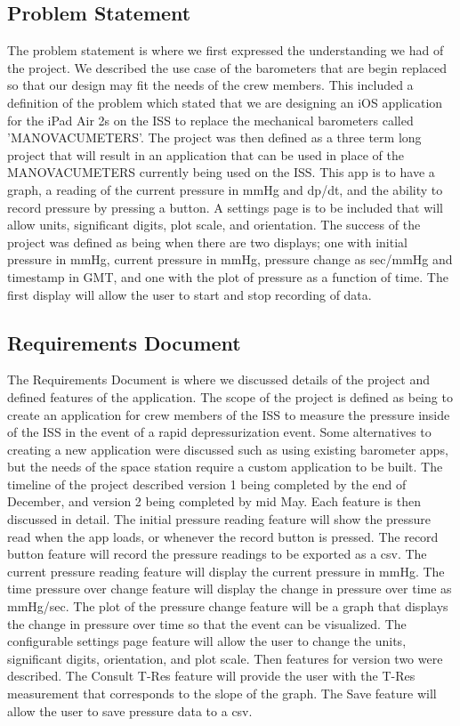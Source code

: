 \documentclass[onecolumn, draftclsnofoot,10pt, compsoc]{IEEEtran}
\begin{document}
\subsection{Problem Statement}
The problem statement is where we first expressed the understanding we had of the project.
We described the use case of the barometers that are begin replaced so that our design may fit the needs of the crew members.
This included a definition of the problem which stated that we are designing an iOS application for the iPad Air 2s on the ISS to replace the mechanical barometers called 'MANOVACUMETERS'.
The project was then defined as a three term long project that will result in an application that can be used in place of the MANOVACUMETERS currently being used on the ISS.
This app is to have a graph, a reading of the current pressure in mmHg and dp/dt, and the ability to record pressure by pressing a button.
A settings page is to be included that will allow units, significant digits, plot scale, and orientation.
The success of the project was defined as being when there are two displays; one with initial pressure in mmHg, current pressure in mmHg, pressure change as sec/mmHg and timestamp in GMT, and one with the plot of pressure as a function of time.
The first display will allow the user to start and stop recording of data.

\subsection{Requirements Document}
The Requirements Document is where we discussed details of the project and defined features of the application.
The scope of the project is defined as being to create an application for crew members of the ISS to measure the pressure inside of the ISS in the event of a rapid depressurization event.
Some alternatives to creating a new application were discussed such as using existing barometer apps, but the needs of the space station require a custom application to be built.
The timeline of the project described version 1 being completed by the end of December, and version 2 being completed by mid May.
Each feature is then discussed in detail.
The initial pressure reading feature will show the pressure read when the app loads, or whenever the record button is pressed.
The record button feature will record the pressure readings to be exported as a csv.
The current pressure reading feature will display the current pressure in mmHg.
The time pressure over change feature will display the change in pressure over time as mmHg/sec.
The plot of the pressure change feature will be a graph that displays the change in pressure over time so that the event can be visualized.
The configurable settings page feature will allow the user to change the units, significant digits, orientation, and plot scale.
Then features for version two were described.
The Consult T-Res feature will provide the user with the T-Res measurement that  corresponds to the slope of the graph.
The Save feature will allow the user to save pressure data to a csv.
\end{document}
